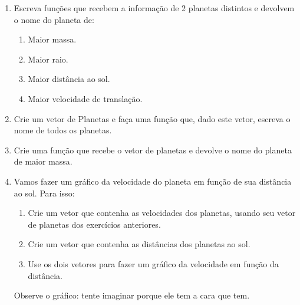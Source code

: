 \documentclass[10pt,a4paper,ssfamily]{exam}
\begin{document}
\begin{enumerate}
\item
Escreva funções que recebem a informação de 2 planetas distintos e
devolvem o nome do planeta de:
\begin{enumerate}
\item
Maior massa.
\item
Maior raio.
\item
Maior distância ao sol.
\item
Maior velocidade de translação.
\end{enumerate}

\item
Crie um vetor de Planetas e faça uma função que, dado este vetor,
escreva o nome de todos os planetas.

\item
Crie uma função que recebe o vetor de planetas e devolve o nome do
planeta de maior massa.

\item
Vamos fazer um gráfico da velocidade do planeta em função de sua
distância ao sol. Para isso:
\begin{enumerate}
\item
Crie um vetor que contenha as velocidades dos planetas, usando seu vetor
de planetas dos exercícios anteriores.
\item
Crie um vetor que contenha as distâncias dos planetas ao sol.
\item
Use os dois vetores para fazer um gráfico da velocidade em função da
distância.
\end{enumerate}
Observe o gráfico: tente imaginar porque ele tem a cara que tem.


\end{enumerate}
\end{document}
